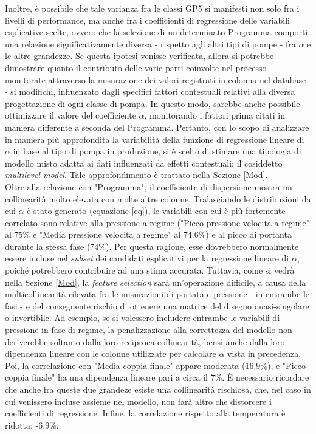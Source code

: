 \documentclass[fleqn,10pt]{SelfArx} %
\begin{document}
Inoltre, è possibile che tale varianza fra le classi GP5 si manifesti non solo fra i livelli di performance, ma anche fra i coefficienti di regressione delle variabili esplicative scelte, ovvero che la selezione di un determinato Programma comporti una relazione significativamente diversa - rispetto agli altri tipi di pompe - fra $\alpha$ e le altre grandezze. Se questa ipotesi venisse verificata, allora si potrebbe dimostrare quanto il contributo delle varie parti coinvolte nel processo - monitorate attraverso la misurazione dei valori registrati in colonna nel database - si modifichi, influenzato dagli specifici fattori contestuali relativi alla diversa progettazione di ogni classe di pompa. In questo modo, sarebbe anche possibile ottimizzare il valore del coefficiente $\alpha$, monitorando i fattori prima citati in maniera differente a seconda del Programma. Pertanto, con lo scopo di analizzare in maniera più approfondita la variabilità della funzione di regressione lineare di $\alpha$ in base al tipo di pompa in produzione, si è scelto di stimare una tipologia di modello misto adatta ai dati influenzati da effetti contestuali: il cosiddetto \textit{multilevel model}. Tale approfondimento è trattato nella Sezione \ref{Mod}.\\
Oltre alla relazione con "Programma", il coefficiente di dispersione mostra un collinearità molto elevata con molte altre colonne. Tralasciando le distribuzioni da cui $\alpha$ è stato generato (equazione \ref{eq}), le variabili con cui è più fortemente correlato sono relative alla pressione a regime ("Picco pressione velocita a regime" al 75\% e "Media pressione velocita a regime" al 74.6\%) e al picco di portanta durante la stessa fase (74\%). Per questa ragione, esse dovrebbero normalmente essere incluse nel \textit{subset} dei candidati esplicativi per la regressione lineare di $\alpha$, poiché potrebbero contribuire ad una stima accurata. Tuttavia, come si vedrà nella Sezione \ref{Mod}, la \textit{feature selection} sarà un'operazione difficile, a causa della multicollinearità rilevata fra le misurazioni di portata e pressione - in entrambe le fasi - e del conseguente rischio di ottenere una matrice del disegno quasi-singolare o invertibile. Ad esempio, se si volessero includere entrambe le variabili di pressione in fase di regime, la penalizzazione alla correttezza del modello non deriverebbe soltanto dalla loro reciproca collinearità, bensì anche dalla loro dipendenza lineare con le colonne utilizzate per calcolare $\alpha$ vista in precedenza. Poi, la correlazione con "Media coppia finale" appare moderata (16.9\%), e "Picco coppia finale" ha una dipendenza lineare pari a circa il 7\%. È necessario ricordare che anche fra queste due grandeze esiste una collinearità rischiosa, che, nel caso in cui venissero incluse assieme nel modello, non farà altro che distorcere i coefficienti di regressione. Infine, la correlazione rispetto alla temperatura è ridotta: -6.9\%.\\
\end{document}
